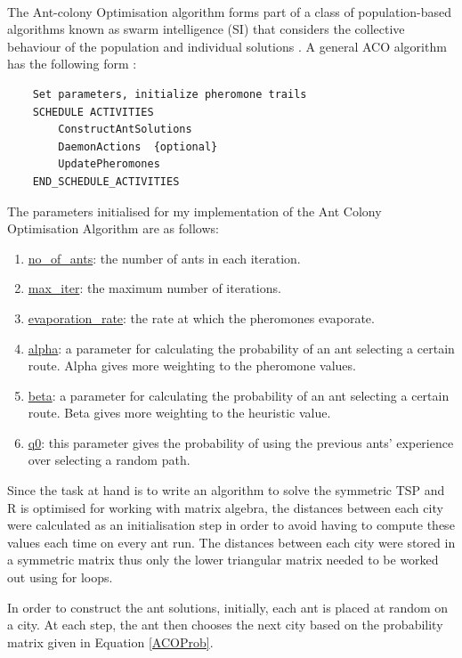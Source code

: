 \documentclass[11pt,a4paper,final]{article}
\begin{document}
	\paragraph{} The Ant-colony Optimisation algorithm forms part of a class of population-based algorithms known as swarm intelligence (SI) that considers the collective behaviour of the population and individual solutions \cite{fastACO}. A general ACO algorithm has the following form \cite{scholarACO}:\\
	\begin{lstlisting}
	Set parameters, initialize pheromone trails
	SCHEDULE ACTIVITIES
		ConstructAntSolutions
		DaemonActions  {optional}
		UpdatePheromones
	END_SCHEDULE_ACTIVITIES
	\end{lstlisting}
	
	\par The parameters initialised for my implementation of the Ant Colony Optimisation Algorithm are as follows:
	\begin{enumerate}
		\item \underline{no\_of\_ants}: the number of ants in each iteration.
		\item \underline{max\_iter}: the maximum number of iterations.
		\item \underline{evaporation\_rate}: the rate at which the pheromones evaporate.
		\item \underline{alpha}: a parameter for calculating the probability of an ant selecting a certain route. Alpha gives more weighting to the pheromone values.
		\item \underline{beta}: a parameter for calculating the probability of an ant selecting a certain route. Beta gives more weighting to the heuristic value.
		\item \underline{q0}: this parameter gives the probability of using the previous ants' experience over selecting a random path.
	\end{enumerate} 
	\par Since the task at hand is to write an algorithm to solve the symmetric TSP and R is optimised for working with matrix algebra, the distances between each city were calculated as an initialisation step in order to avoid having to compute these values each time on every ant run. The distances between each city were stored in a symmetric matrix thus only the lower triangular matrix needed to be worked out using for loops.\\
	
	\par In order to construct the ant solutions, initially, each ant is placed at random on a city. At each step, the ant then chooses the next city based on the probability matrix given in Equation \ref{ACOProb}.
	
\end{document}
